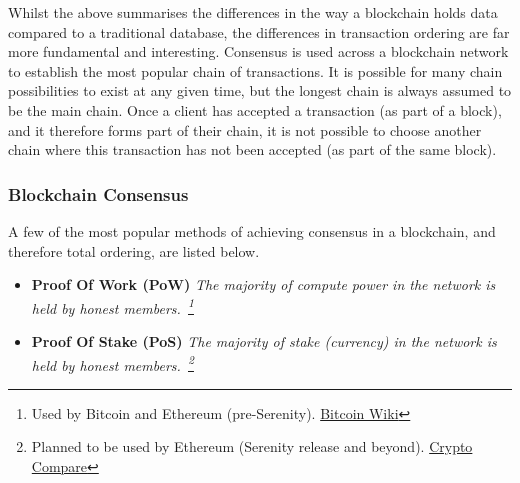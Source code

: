 Whilst the above summarises the differences in the way a blockchain holds data compared to a traditional database, the differences in transaction ordering are far more fundamental and interesting. Consensus is used across a blockchain network to establish the most popular chain of transactions. It is possible for many chain possibilities to exist at any given time, but the longest chain is always assumed to be the main chain. Once a client has accepted a transaction (as part of a block), and it therefore forms part of their chain, it is not possible to choose another chain where this transaction has not been accepted (as part of the same block).

\subsubsection{Blockchain Consensus}

A few of the most popular methods of achieving consensus in a blockchain, and therefore total ordering, are listed below.

\begin{itemize}
  \item
    \textbf{Proof Of Work (PoW)}
    \textit{The majority of compute power in the network is held by honest members.~\footnote{Used by Bitcoin and Ethereum (pre-Serenity). \href{https://en.bitcoin.it/wiki/Proof_of_work}{Bitcoin Wiki}}}
  \item
    \textbf{Proof Of Stake (PoS)}
    \textit{The majority of stake (currency) in the network is held by honest members.~\footnote{Planned to be used by Ethereum (Serenity release and beyond). \href{https://www.cryptocompare.com/coins/guides/the-ethereum-releases-of-frontier-homestead-metropolis-and-serenity/}{Crypto Compare}}}
\end{itemize}

